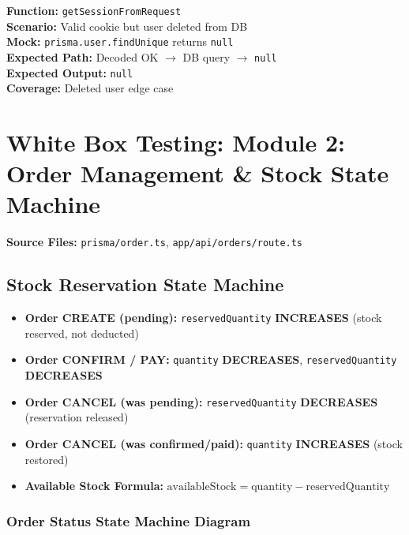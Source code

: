 \documentclass[12pt,onecolumn]{IEEEtran}
\let\oldsection\section
\renewcommand{\section}{\clearpage\oldsection}
\begin{document}
\textbf{Function:} \texttt{getSessionFromRequest} \\
\textbf{Scenario:} Valid cookie but user deleted from DB \\
\textbf{Mock:} \texttt{prisma.user.findUnique} returns \texttt{null} \\
\textbf{Expected Path:} Decoded OK $\to$ DB query $\to$ \texttt{null} \\
\textbf{Expected Output:} \texttt{null} \\
\textbf{Coverage:} Deleted user edge case





\section{White Box Testing: Module 2: Order Management \& Stock State Machine}


\textbf{Source Files:} \texttt{prisma/order.ts}, \texttt{app/api/orders/route.ts}

\subsection{Stock Reservation State Machine}


\begin{itemize}
  \item \textbf{Order CREATE (pending):} \texttt{reservedQuantity} \textbf{INCREASES} (stock reserved, not deducted)
  \item \textbf{Order CONFIRM / PAY:} \texttt{quantity} \textbf{DECREASES}, \texttt{reservedQuantity} \textbf{DECREASES}
  \item \textbf{Order CANCEL (was pending):} \texttt{reservedQuantity} \textbf{DECREASES} (reservation released)
  \item \textbf{Order CANCEL (was confirmed/paid):} \texttt{quantity} \textbf{INCREASES} (stock restored)
  \item \textbf{Available Stock Formula:} $\text{availableStock} = \text{quantity} - \text{reservedQuantity}$
\end{itemize}


\subsubsection{Order Status State Machine Diagram}
\end{document}
